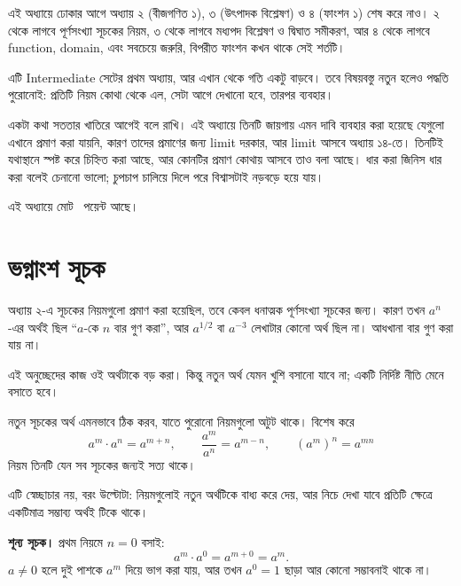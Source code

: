 \documentclass[11pt]{article}
\begin{document}

\noindent
এই অধ্যায়ে ঢোকার আগে অধ্যায় ২ (বীজগণিত ১), ৩ (উৎপাদক বিশ্লেষণ) ও ৪
(ফাংশন ১) শেষ করে নাও। ২ থেকে লাগবে পূর্ণসংখ্যা সূচকের নিয়ম, ৩ থেকে লাগবে
মধ্যপদ বিশ্লেষণ ও দ্বিঘাত সমীকরণ, আর ৪ থেকে লাগবে function, domain, এবং সবচেয়ে
জরুরি, বিপরীত ফাংশন কখন থাকে সেই শর্তটি।

এটি Intermediate সেটের প্রথম অধ্যায়, আর এখান থেকে গতি একটু বাড়বে। তবে
বিষয়বস্তু নতুন হলেও পদ্ধতি পুরোনোই: প্রতিটি নিয়ম কোথা থেকে এল, সেটা আগে
দেখানো হবে, তারপর ব্যবহার।

একটা কথা সততার খাতিরে আগেই বলে রাখি। এই অধ্যায়ে তিনটি জায়গায় এমন দাবি
ব্যবহার করা হয়েছে যেগুলো এখানে প্রমাণ করা যায়নি, কারণ তাদের প্রমাণের জন্য
limit দরকার, আর limit আসবে অধ্যায় ১৪-তে। তিনটিই যথাস্থানে স্পষ্ট করে চিহ্নিত
করা আছে, আর কোনটির প্রমাণ কোথায় আসবে তাও বলা আছে। ধার করা জিনিস ধার করা বলেই
চেনানো ভালো; চুপচাপ চালিয়ে দিলে পরে বিশ্বাসটাই নড়বড়ে হয়ে যায়।

এই অধ্যায়ে মোট \totalpoints\ পয়েন্ট আছে।

\section{ভগ্নাংশ সূচক}

অধ্যায় ২-এ সূচকের নিয়মগুলো প্রমাণ করা হয়েছিল, তবে কেবল ধনাত্মক পূর্ণসংখ্যা
সূচকের জন্য। কারণ তখন $a^{n}$-এর অর্থই ছিল ``$a$-কে $n$ বার গুণ করা'', আর
$a^{1/2}$ বা $a^{-3}$ লেখাটার কোনো অর্থ ছিল না। আধখানা বার গুণ করা যায় না।

এই অনুচ্ছেদের কাজ ওই অর্থটাকে বড় করা। কিন্তু নতুন অর্থ যেমন খুশি বসানো যাবে না;
একটি নির্দিষ্ট নীতি মেনে বসাতে হবে।

\begin{idea}[সম্প্রসারণের নীতি]
নতুন সূচকের অর্থ এমনভাবে ঠিক করব, যাতে পুরোনো নিয়মগুলো অটুট থাকে। বিশেষ করে
\[
  a^{m} \cdot a^{n} = a^{m+n}, \qquad
  \frac{a^{m}}{a^{n}} = a^{m-n}, \qquad
  (a^{m})^{n} = a^{mn}
\]
নিয়ম তিনটি যেন সব সূচকের জন্যই সত্য থাকে।

এটি স্বেচ্ছাচার নয়, বরং উল্টোটা: নিয়মগুলোই নতুন অর্থটিকে বাধ্য করে দেয়, আর
নিচে দেখা যাবে প্রতিটি ক্ষেত্রে একটিমাত্র সম্ভাব্য অর্থই টিকে থাকে।
\end{idea}

\noindent
\textbf{শূন্য সূচক।} প্রথম নিয়মে $n = 0$ বসাই:
\[
  a^{m} \cdot a^{0} = a^{m+0} = a^{m} .
\]
$a \neq 0$ হলে দুই পাশকে $a^{m}$ দিয়ে ভাগ করা যায়, আর তখন $a^{0} = 1$ ছাড়া আর
কোনো সম্ভাবনাই থাকে না।
\end{document}
